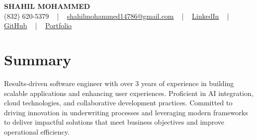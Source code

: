 \documentclass[letterpaper,10pt]{article}
\begin{document}
\begin{center}
    {\fontsize{14pt}{12pt}\selectfont \textbf{\MakeUppercase{Shahil Mohammed}}}\\ \vspace{2pt}
    \fontsize{10pt}{12pt}\selectfont (832) 620-5379 ~ | ~ \href{mailto:shahilmohammed14786@gmail.com}{shahilmohammed14786@gmail.com} ~ | ~  
    \href{https://www.linkedin.com/in/shahil-mohammed-9652931a1/}{\color{blue}\underline{LinkedIn}}  ~ | ~ 
    \href{https://github.com/freakbeast14}{\color{blue}\underline{GitHub}} ~ | ~ 
    \href{https://shahil-mohammed.netlify.app/}{\color{blue}\underline{Portfolio}}
    \vspace{-8pt}
\end{center}

\section{Summary}
\vspace{-2pt}\fontsize{8pt}{9pt}\selectfont
Results-driven software engineer with over 3 years of experience in building scalable applications and enhancing user experiences. Proficient in AI integration, cloud technologies, and collaborative development practices. Committed to driving innovation in underwriting processes and leveraging modern frameworks to deliver impactful solutions that meet business objectives and improve operational efficiency.
 \vspace{-5pt}
 
\vspace{-2pt}
\end{document}
